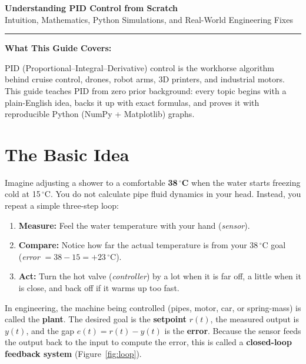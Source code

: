 \documentclass[10pt,a4paper]{article}
\newenvironment{notebox}[1][Key Idea]{%
  \def\FrameCommand{\fboxsep=6pt\fcolorbox{NavyBlue!45!white}{SoftBg}}%
  \MakeFramed{\advance\hsize-\width\FrameRestore}%
  \noindent\textbf{\color{NavyBlue}#1:} \ignorespaces
}{\endMakeFramed}
\begin{document}
\begin{center}
  {\LARGE\bfseries\color{NavyBlue} Understanding PID Control from Scratch}\\[0.35em]
  {\normalsize\color{black!75} Intuition, Mathematics, Python Simulations, and Real-World Engineering Fixes}
\end{center}
\vspace{-0.3em}
\noindent\color{RuleGray}\rule{\textwidth}{0.8pt}\color{black}

\begin{notebox}[What This Guide Covers]
PID (Proportional--Integral--Derivative) control is the workhorse algorithm behind cruise control, drones, robot arms, 3D printers, and industrial motors. This guide teaches PID from zero prior background: every topic begins with a plain-English idea, backs it up with exact formulas, and proves it with reproducible Python (NumPy + Matplotlib) graphs.
\end{notebox}

\section{The Basic Idea}
Imagine adjusting a shower to a comfortable \textbf{38\,$^\circ$C} when the water starts freezing cold at 15\,$^\circ$C. You do not calculate pipe fluid dynamics in your head. Instead, you repeat a simple three-step loop:
\begin{enumerate}
  \item \textbf{Measure:} Feel the water temperature with your hand (\textit{sensor}).
  \item \textbf{Compare:} Notice how far the actual temperature is from your 38\,$^\circ$C goal (\textit{error} $= 38 - 15 = +23\,^\circ\text{C}$).
  \item \textbf{Act:} Turn the hot valve (\textit{controller}) by a lot when it is far off, a little when it is close, and back off if it warms up too fast.
\end{enumerate}

In engineering, the machine being controlled (pipes, motor, car, or spring-mass) is called the \textbf{plant}. The desired goal is the \textbf{setpoint} $r(t)$, the measured output is $y(t)$, and the gap $e(t) = r(t) - y(t)$ is the \textbf{error}. Because the sensor feeds the output back to the input to compute the error, this is called a \textbf{closed-loop feedback system} (Figure~\ref{fig:loop}).
\end{document}
